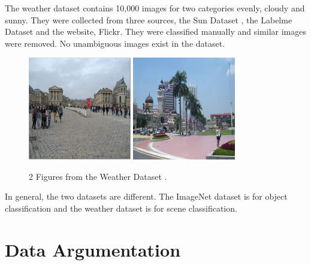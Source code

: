 The weather dataset \citep{lutwo} contains 10,000 images for two categories evenly, cloudy and sunny. They were collected from three sources, the Sun Dataset \citep{russell2008labelme}, the Labelme Dataset \citep{xiao2010sun} and the website, Flickr. They were classified manually and similar images were removed. No unambiguous images exist in the dataset.
\graphicspath{ {./Figures/} }
\begin{figure}[!htb]
    \centering
	\includegraphics[width=0.4\textwidth]{cloudy_0001.png}
    \qquad
    \includegraphics[width=0.4\textwidth]{sunny_0003.png}
    \caption{2 Figures from the Weather Dataset \citep{lutwo}.}%
    \label{fig:WeatherExamples}%
\end{figure}

In general, the two datasets are different. The ImageNet dataset is for object classification and the weather dataset is for scene classification.

\section{Data Argumentation}

